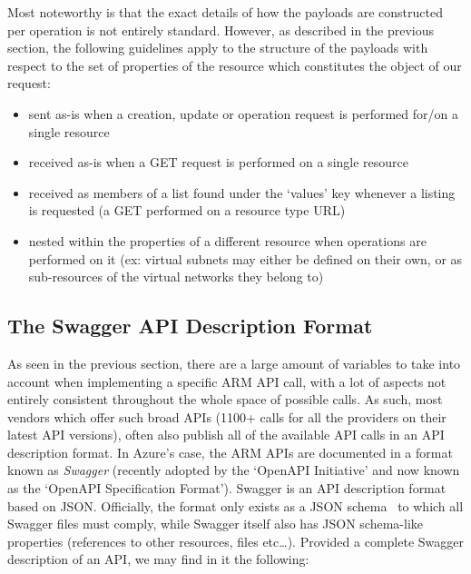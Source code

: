 \documentclass[11pt]{report}
\begin{document}
Most noteworthy is that the exact details of how the payloads are constructed
per operation is not entirely standard. However, as described in the previous
section, the following guidelines apply to the structure of the payloads with
respect to the set of properties of the resource which constitutes the object
of our request:

\begin{itemize}
    \item{} sent as-is when a creation, update or operation request is
        performed for/on a single resource
    \item{} received as-is when a GET request is performed on a single
        resource
    \item{} received as members of a list found under the `values' key
        whenever a listing is requested (a GET performed on a resource type URL)
    \item{} nested within the properties of a different resource when
        operations are performed on it (ex: virtual subnets may either
        be defined on their own, or as sub-resources of the virtual networks
        they belong to)
\end{itemize}

\subsection{The Swagger API Description Format}

As seen in the previous section, there are a large amount of variables to take
into account when implementing a specific ARM API call, with a lot of aspects
not entirely consistent throughout the whole space of possible calls. As
such, most vendors which offer such broad APIs (1100+ calls for all the
providers on their latest API versions), often also publish all of the
available API calls in an API description format. In Azure's case, the ARM APIs
are documented \cite{azureApiSpecs} in a format known as \textit{Swagger}
(recently adopted by the `OpenAPI Initiative' \cite{openApiInitiative} and
now known as the  `OpenAPI Specification Format').
Swagger is an API description format based on JSON\@. Officially, the format only
exists as a JSON schema~\cite{swaggerSpecification} to which all Swagger files
must comply, while Swagger itself also has JSON schema-like properties (references
to other resources, files etc\ldots). Provided a complete Swagger description
of an API, we may find in it the following:
\end{document}
